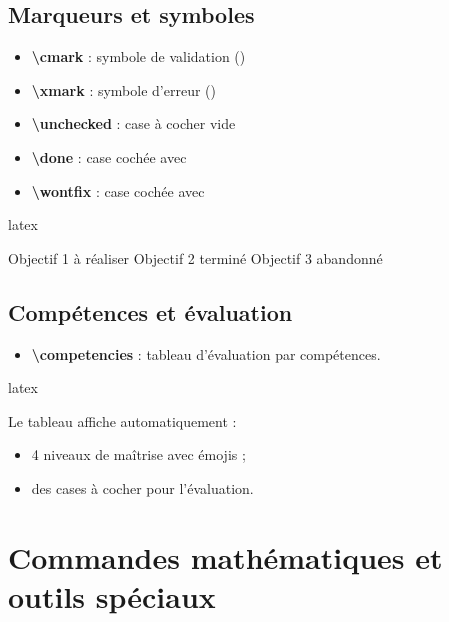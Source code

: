 \documentclass[
    french,
    margin=2cm
]{neoschool}
\begin{document}
\subsection{Marqueurs et symboles}

\begin{itemize}
\item
  \textbf{\textbackslash cmark} : symbole de validation (\cmark)
\item
  \textbf{\textbackslash xmark} : symbole d'erreur (\xmark)
\item
  \textbf{\textbackslash unchecked} : case à cocher vide \unchecked
\item
  \textbf{\textbackslash done} : case cochée avec \done
\item
  \textbf{\textbackslash wontfix} : case cochée avec \wontfix
\end{itemize}

\begin{code}{latex}
\begin{itemize}
    \unchecked Objectif 1 à réaliser
    \done      Objectif 2 terminé
    \wontfix   Objectif 3 abandonné
\end{itemize}
\end{code}

\subsection{Compétences et évaluation}

\begin{itemize}
\item
  \textbf{\textbackslash competencies} : tableau d'évaluation par
  compétences.
\end{itemize}

\begin{code}{latex}
\end{code}

Le tableau affiche automatiquement :
\begin{itemize}
\item 4 niveaux de maîtrise avec émojis ;
\item des cases à cocher pour l'évaluation.
\end{itemize}

\section{Commandes mathématiques et outils spéciaux}
\end{document}
